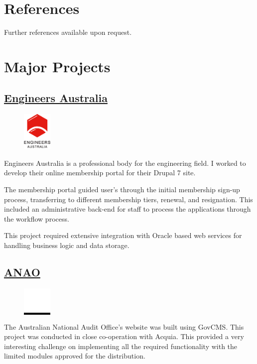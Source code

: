 \documentclass[11pt,a4paper,sans]{moderncv}        %
\begin{document}
\section{References}
  Further references available upon request.

\clearpage
\section{Major Projects}
  \subsection{\href{https://www.engineersaustralia.org.au/}{Engineers Australia}}
    \begin{figure}
      \vspace{-10pt}
      \includegraphics[width=0.125\textwidth]{EA_logo}
      \vspace{-20pt}
    \end{figure}
    Engineers Australia is a professional body for the engineering field. I worked to develop their online membership portal for their Drupal 7 site.
    
    The membership portal guided user's through the initial membership sign-up process, transferring to different membership tiers, renewal, and resignation. This included an administrative back-end for staff to process the applications through the workflow process.

    This project required extensive integration with Oracle based web services for handling business logic and data storage.

  \subsection{\href{https://www.anao.gov.au/}{\ac{ANAO}}}
    \begin{figure}
      \vspace{-15pt}
      \colorbox{black}{\includegraphics[width=0.125\textwidth]{ANAO_logo}}
      \vspace{-25pt}
    \end{figure}
    The Australian National Audit Office's website was built using GovCMS\@. This project was conducted in close co-operation with Acquia. This provided a very interesting challenge on implementing all the required functionality with the limited modules approved for the distribution.
\end{document}
